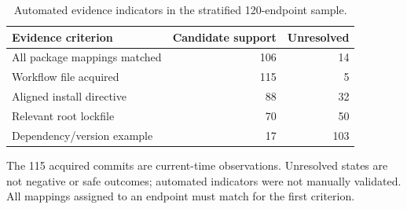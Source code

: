 \begin{table}[t]
\centering
\footnotesize
\caption{Automated evidence indicators in the stratified 120-endpoint sample.}
\label{tab:revision_audit}
\begin{tabular}{lrr}
\toprule
Evidence criterion & Candidate support & Unresolved\\
\midrule
All package mappings matched & 106 & 14\\
Workflow file acquired & 115 & 5\\
Aligned install directive & 88 & 32\\
Relevant root lockfile & 70 & 50\\
Dependency/version example & 17 & 103\\
\bottomrule
\end{tabular}
\par\smallskip\begin{minipage}{0.98\textwidth}\footnotesize The 115 acquired commits are current-time observations. Unresolved states are not negative or safe outcomes; automated indicators were not manually validated. All mappings assigned to an endpoint must match for the first criterion.\end{minipage}
\end{table}
